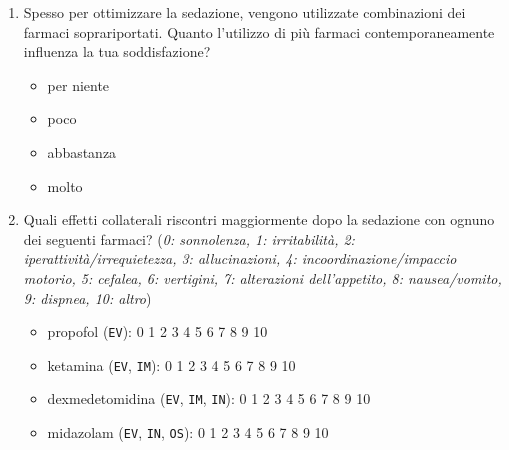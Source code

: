 \begin{tcolorbox}[breakable,notitle,boxrule=0pt,colback=xkcdCloudyBlue!30,colframe=xkcdCloudyBlue!30]
\begin{enumerate}
           \item Spesso per ottimizzare la sedazione, vengono utilizzate combinazioni dei farmaci soprariportati. Quanto l'utilizzo di più farmaci contemporaneamente influenza la tua soddisfazione?
           \begin{itemize}
               \item per niente
               \item poco
               \item abbastanza
               \item molto
           \end{itemize}
           
           \item Quali effetti collaterali riscontri maggiormente dopo la sedazione con ognuno dei seguenti farmaci? (\emph{0: sonnolenza, 1: irritabilità, 2: iperattività/irrequietezza, 3: allucinazioni, 4: incoordinazione/impaccio motorio, 5: cefalea, 6: vertigini, 7: alterazioni dell’appetito, 8: nausea/vomito, 9: dispnea, 10: altro})
           
\begin{comment}
    \bgroup
        \def\arraystretch{1.5}
        \begin{table}[!ht]
            \begin{tabular}{ll}
                $\qquad\enspace\,\,\,\,\,\bullet$ propofol (\texttt{EV}): & 0 1 2 3 4 5 6 7 8 9 10\\
                ketamina (\texttt{EV}, \texttt{IM}): & 0 1 2 3 4 5 6 7 8 9 10\\
                dexmedetomidina (\texttt{EV}, \texttt{IM}): & 0 1 2 3 4 5 6 7 8 9 10\\
                midazolam (\texttt{EV}, \texttt{IN}, \texttt{OS}): & 0 1 2 3 4 5 6 7 8 9 10
            \end{tabular}
        \end{table}
    \egroup   
\end{comment}

           \begin{itemize}
               \item propofol (\texttt{EV}): 0 1 2 3 4 5 6 7 8 9 10
               \item ketamina (\texttt{EV}, \texttt{IM}): 0 1 2 3 4 5 6 7 8 9 10
               \item dexmedetomidina (\texttt{EV}, \texttt{IM}, \texttt{IN}): 0 1 2 3 4 5 6 7 8 9 10
               \item midazolam (\texttt{EV}, \texttt{IN}, \texttt{OS}): 0 1 2 3 4 5 6 7 8 9 10
           \end{itemize}
           

\end{enumerate}
\end{tcolorbox}
